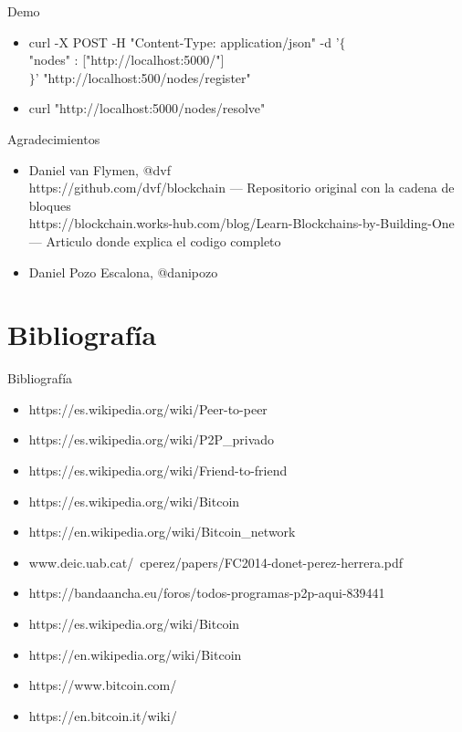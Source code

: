 \documentclass[compress,brown,xcolor=table]{beamer}
\begin{document}
\begin{frame}{Demo}
	\begin{itemize}
	\item curl -X POST -H "Content-Type: application/json" -d '$\{$\\
                                     "nodes" : ["http://localhost:5000/"]\\
                                    $\}$' "http://localhost:500/nodes/register"
    \item curl "http://localhost:5000/nodes/resolve"                                	

	
\end{itemize}
\end{frame}
\begin{frame}{Agradecimientos}
	\begin{itemize}
	\item Daniel van Flymen, @dvf\\
	https://github.com/dvf/blockchain --- Repositorio original con la cadena de bloques\\
	https://blockchain.works-hub.com/blog/Learn-Blockchains-by-Building-One --- Articulo donde explica el codigo completo
	\item Daniel Pozo Escalona, @danipozo
	

\end{itemize}
\end{frame}

\section{Bibliografía}

\begin{frame}{Bibliografía}
\begin{itemize}
	\item https://es.wikipedia.org/wiki/Peer-to-peer
	\item https://es.wikipedia.org/wiki/P2P\_privado
	\item https://es.wikipedia.org/wiki/Friend-to-friend
	\item https://es.wikipedia.org/wiki/Bitcoin
	\item https://en.wikipedia.org/wiki/Bitcoin\_network
	\item www.deic.uab.cat/~cperez/papers/FC2014-donet-perez-herrera.pdf
	\item https://bandaancha.eu/foros/todos-programas-p2p-aqui-839441
	\item https://es.wikipedia.org/wiki/Bitcoin
	\item https://en.wikipedia.org/wiki/Bitcoin
	\item https://www.bitcoin.com/
	\item https://en.bitcoin.it/wiki/
\end{itemize}
\end{frame}
\end{document}
